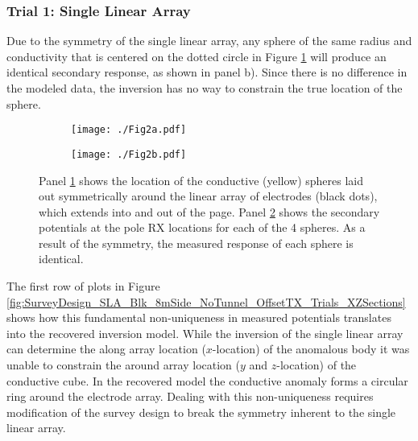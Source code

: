 \documentclass[preprint,authoryear,12pt]{elsarticle}
\begin{document}
\subsubsection{Trial 1: Single Linear Array}
\label{sec:TheoreticalAnalysis_Trial1_SingleLinearArray}

Due to the symmetry of the single linear array, any sphere of the same radius and conductivity that is centered on the dotted circle in Figure \ref{fig:4Spheres_Symmetric_Model} will produce an identical secondary response, as shown in panel b). Since there is no difference in the modeled data, the inversion has no way to constrain the true location of the sphere.


\begin{figure}[htp]
   \begin{center}
      \begin{subfigure}{0.4\linewidth}
         \texttt{[image: ./Fig2a.pdf]}
         \caption{}
         \label{fig:4Spheres_Symmetric_Model}
      \end{subfigure}
      \hfill
      \begin{subfigure}{0.59\linewidth}
         \texttt{[image: ./Fig2b.pdf]}
         \caption{}
         \label{fig:4Spheres_Symmetric_Vs}
      \end{subfigure}
   \end{center}
\caption{Panel \ref{fig:4Spheres_Symmetric_Model} shows the location of the conductive (yellow) spheres laid out symmetrically around the linear array of electrodes (black dots), which extends into and out of the page. Panel \ref{fig:4Spheres_Symmetric_Vs} shows the secondary potentials at the pole RX locations for each of the 4 spheres. As a result of the symmetry, the measured response of each sphere is identical.}
\label{fig:4Spheres_Symmetric}
\end{figure}


The first row of plots in Figure \ref{fig:SurveyDesign_SLA_Blk_8mSide_NoTunnel_OffsetTX_Trials_XZSections} shows how this fundamental non-uniqueness in measured potentials translates into the recovered inversion model. While the inversion of the single linear array can determine the along array location ($x$-location) of the anomalous body it was unable to constrain the around array location ($y$ and $z$-location) of the conductive cube. In the recovered model the conductive anomaly forms a circular ring around the electrode array. Dealing with this non-uniqueness requires modification of the survey design to break the symmetry inherent to the single linear array.
\end{document}
